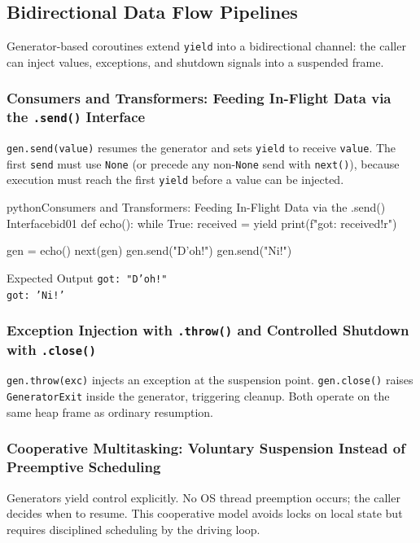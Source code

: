 \subsection{Bidirectional Data Flow Pipelines}

Generator-based coroutines extend \texttt{yield} into a bidirectional channel: the caller can inject values, exceptions, and shutdown signals into a suspended frame.

\subsubsection{Consumers and Transformers: Feeding In-Flight Data via the \texttt{.send()} Interface}

\texttt{gen.send(value)} resumes the generator and sets \texttt{yield} to receive \texttt{value}. The first \texttt{send} must use \texttt{None} (or precede any non-\texttt{None} send with \texttt{next()}), because execution must reach the first \texttt{yield} before a value can be injected.

\begin{codebox}[]{python}{Consumers and Transformers: Feeding In-Flight Data via the .send() Interface}{bid01}
def echo():
    while True:
        received = yield
        print(f"got: {received!r}")

gen = echo()
next(gen)
gen.send("D'oh!")
gen.send("Ni!")
\end{codebox}


\begin{iobox}{Expected Output}
\texttt{got: "D'oh!"} \\
\texttt{got: 'Ni!'} \\
\end{iobox}




\subsubsection{Exception Injection with \texttt{.throw()} and Controlled Shutdown with \texttt{.close()}}

\texttt{gen.throw(exc)} injects an exception at the suspension point. \texttt{gen.close()} raises \texttt{GeneratorExit} inside the generator, triggering cleanup. Both operate on the same heap frame as ordinary resumption.

\subsubsection{Cooperative Multitasking: Voluntary Suspension Instead of Preemptive Scheduling}

Generators yield control explicitly. No OS thread preemption occurs; the caller decides when to resume. This cooperative model avoids locks on local state but requires disciplined scheduling by the driving loop.
